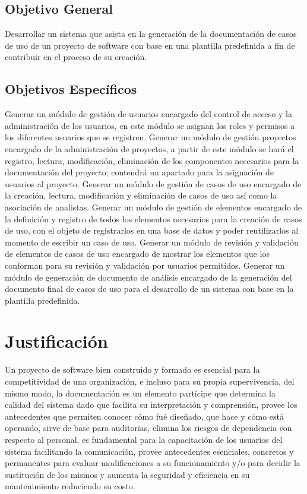 \subsection{Objetivo General}
Desarrollar un sistema que asista en la generación de la documentación de casos de uso de un proyecto de software con base en una plantilla predefinida a fin de contribuir en el proceso de su creación.

\subsection{Objetivos Específicos}
Generar un módulo de gestión de usuarios encargado del control de acceso y la administración de los usuarios, en este módulo se asignan los roles y permisos a los diferentes usuarios que se registren.
Generar un módulo de gestión proyectos encargado de la administración de proyectos, a partir de este módulo se hará el registro, lectura, modificación, eliminación de los componentes necesarios para la documentación del proyecto; contendrá un apartado para la asignación de usuarios al proyecto.
Generar un módulo de gestión de casos de uso encargado de la creación, lectura, modificación y eliminación de casos de uso así como la asociación de analistas.
Generar un módulo de gestión de elementos encargado de la definición y registro de todos los elementos necesarios para la creación de casos de uso, con el objeto de registrarlos en una base de datos y poder reutilizarlos al momento de escribir un caso de uso.
Generar un módulo de revisión y validación de elementos de casos de uso encargado de mostrar los elementos que los conforman para su revisión y validación por usuarios permitidos.
Generar un módulo de generación de documento de análisis encargado de la generación del documento final de casos de uso para el desarrollo de un sistema con base en la plantilla predefinida.


\section{Justificación}
Un proyecto de software bien construido y formado es esencial para la competitividad de una organización, e incluso para su propia supervivencia, del mismo modo, la documentación es un elemento partícipe que determina la calidad del sistema dado que facilita su interpretación y comprensión, provee los antecedentes que permiten conocer cómo fué diseñado, que hace y cómo está operando, sirve de base para auditorias, elimina los riesgos de dependencia con respecto al personal, es fundamental para la capacitación de los usuarios del sistema facilitando la comunicación, provee antecedentes esenciales, concretos y permanentes para evaluar modificaciones a su funcionamiento y/o para decidir la sustitución de los mismos y aumenta la seguridad y eficiencia en su mantenimiento reduciendo su costo.

